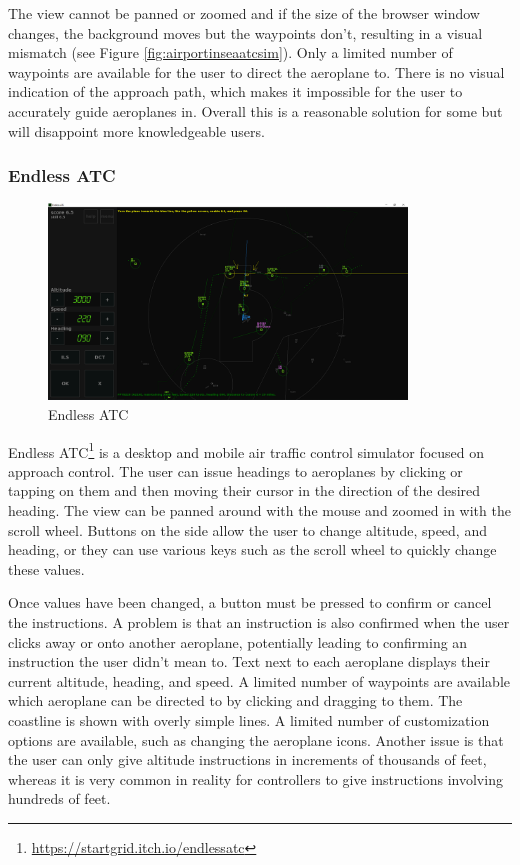 \documentclass{article}
\begin{document}
The view cannot be panned or zoomed and if the size of the browser window changes, the background moves but the waypoints don't, resulting in a visual mismatch (see Figure \ref{fig:airportinseaatcsim}).
Only a limited number of waypoints are available for the user to direct the aeroplane to.
There is no visual indication of the approach path, which makes it impossible for the user to accurately guide aeroplanes in.
Overall this is a reasonable solution for some but will disappoint more knowledgeable users.

\subsubsection{Endless ATC} \label{endlessatc}
\begin{figure}[H]
\centering
\includegraphics[width=0.85\textwidth]{existing_solutions/endlessatc.png}
\caption{\label{fig:endlessatc1}Endless ATC}
\end{figure}
Endless ATC\footnote{\url{https://startgrid.itch.io/endlessatc}} is a desktop and mobile air traffic control simulator focused on approach control.
The user can issue headings to aeroplanes by clicking or tapping on them and then moving their cursor in the direction of the desired heading.
The view can be panned around with the mouse and zoomed in with the scroll wheel.
Buttons on the side allow the user to change altitude, speed, and heading, or they can use various keys such as the scroll wheel to quickly change these values.

Once values have been changed, a button must be pressed to confirm or cancel the instructions.
A problem is that an instruction is also confirmed when the user clicks away or onto another aeroplane, potentially leading to confirming an instruction the user didn't mean to.
Text next to each aeroplane displays their current altitude, heading, and speed.
A limited number of waypoints are available which aeroplane can be directed to by clicking and dragging to them.
The coastline is shown with overly simple lines.
A limited number of customization options are available, such as changing the aeroplane icons.
Another issue is that the user can only give altitude instructions in increments of thousands of feet, whereas it is very common in reality for controllers to give instructions involving hundreds of feet.
\end{document}
